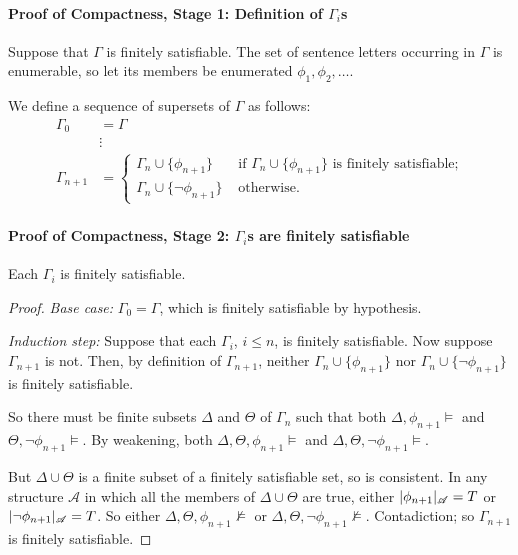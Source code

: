 \paragraph{Proof of Compactness, Stage 1: Definition of $\Gamma_{i}$s}

Suppose that $\Gamma$ is finitely satisfiable. The set of sentence letters occurring in $\Gamma$ is enumerable, so let its members be enumerated $\phi_{1},\phi_{2},\ldots$.

We define a sequence of supersets of $\Gamma$ as follows:
 \begin{align*}
		\Gamma_{0} &= \Gamma\\
	&\vdots \\
	\Gamma_{n+1} &= \begin{cases}
		\Gamma_{n}\cup\{\phi_{n+1}\} &\text{ if } \Gamma_{n} \cup \{\phi_{n+1}\} \text{ is finitely satisfiable;}\\
		\Gamma_{n}\cup\{\neg\phi_{n+1}\} &\text{ otherwise.}
	\end{cases}
\end{align*}



\paragraph{Proof of Compactness, Stage 2:  $\Gamma_{i}$s are finitely satisfiable}

\begin{lemma}
Each $\Gamma_{i}$ is finitely satisfiable.
\begin{proof}
{\emph{Base case:} $\Gamma_{0}=\Gamma$, which is finitely satisfiable by hypothesis.
	
	\emph{Induction step:} Suppose that each $\Gamma_{i}$, $i\leqslant n$, is finitely satisfiable. Now suppose $\Gamma_{n+1}$ is not. Then, by definition of $\Gamma_{n+1}$, neither $\Gamma_{n}\cup\{\phi_{n+1}\}$ nor $\Gamma_{n}\cup\{\neg\phi_{n+1}\}$ is finitely satisfiable.
	
	So there must be finite subsets $\Delta$ and $\Theta$ of $\Gamma_{n}$ such that both $\Delta,\phi_{n+1}\vDash$ and $\Theta,\neg\phi_{n+1}\vDash$. By weakening, both $\Delta,\Theta,\phi_{n+1}\vDash$ and $\Delta,\Theta,\neg\phi_{n+1}\vDash$. 
	
	But $\Delta\cup\Theta$ is a finite subset of a finitely satisfiable set, so is consistent. In any structure $\mathscr{A}$ in which all the members of $\Delta\cup\Theta$ are true, either $|\phi_{n+1}|_{\mathscr{A}}=T$ or $|\neg\phi_{n+1}|_{\mathscr{A}}=T$. So  either $\Delta,\Theta,\phi_{n+1}\not\vDash$ or $\Delta,\Theta,\neg\phi_{n+1}\not\vDash$. Contadiction; so $\Gamma_{n+1}$ is finitely satisfiable. 
}\end{proof}
\end{lemma}

